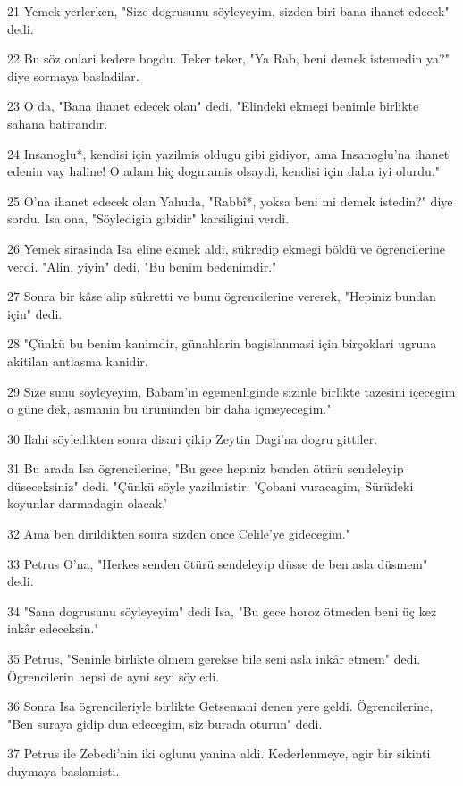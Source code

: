 \par 21 Yemek yerlerken, "Size dogrusunu söyleyeyim, sizden biri bana ihanet edecek" dedi.
\par 22 Bu söz onlari kedere bogdu. Teker teker, "Ya Rab, beni demek istemedin ya?" diye sormaya basladilar.
\par 23 O da, "Bana ihanet edecek olan" dedi, "Elindeki ekmegi benimle birlikte sahana batirandir.
\par 24 Insanoglu*, kendisi için yazilmis oldugu gibi gidiyor, ama Insanoglu'na ihanet edenin vay haline! O adam hiç dogmamis olsaydi, kendisi için daha iyi olurdu."
\par 25 O'na ihanet edecek olan Yahuda, "Rabbî*, yoksa beni mi demek istedin?" diye sordu. Isa ona, "Söyledigin gibidir" karsiligini verdi.
\par 26 Yemek sirasinda Isa eline ekmek aldi, sükredip ekmegi böldü ve ögrencilerine verdi. "Alin, yiyin" dedi, "Bu benim bedenimdir."
\par 27 Sonra bir kâse alip sükretti ve bunu ögrencilerine vererek, "Hepiniz bundan için" dedi.
\par 28 "Çünkü bu benim kanimdir, günahlarin bagislanmasi için birçoklari ugruna akitilan antlasma kanidir.
\par 29 Size sunu söyleyeyim, Babam'in egemenliginde sizinle birlikte tazesini içecegim o güne dek, asmanin bu ürününden bir daha içmeyecegim."
\par 30 Ilahi söyledikten sonra disari çikip Zeytin Dagi'na dogru gittiler.
\par 31 Bu arada Isa ögrencilerine, "Bu gece hepiniz benden ötürü sendeleyip düseceksiniz" dedi. "Çünkü söyle yazilmistir: 'Çobani vuracagim, Sürüdeki koyunlar darmadagin olacak.'
\par 32 Ama ben dirildikten sonra sizden önce Celile'ye gidecegim."
\par 33 Petrus O'na, "Herkes senden ötürü sendeleyip düsse de ben asla düsmem" dedi.
\par 34 "Sana dogrusunu söyleyeyim" dedi Isa, "Bu gece horoz ötmeden beni üç kez inkâr edeceksin."
\par 35 Petrus, "Seninle birlikte ölmem gerekse bile seni asla inkâr etmem" dedi. Ögrencilerin hepsi de ayni seyi söyledi.
\par 36 Sonra Isa ögrencileriyle birlikte Getsemani denen yere geldi. Ögrencilerine, "Ben suraya gidip dua edecegim, siz burada oturun" dedi.
\par 37 Petrus ile Zebedi'nin iki oglunu yanina aldi. Kederlenmeye, agir bir sikinti duymaya baslamisti.
